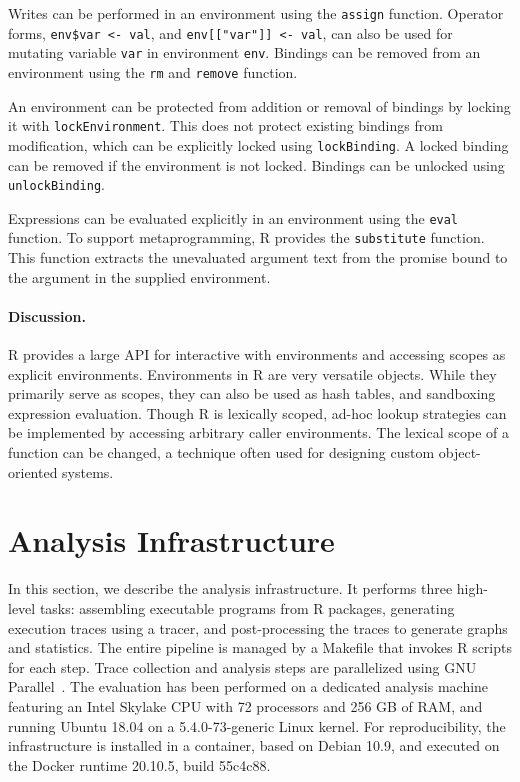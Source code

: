 \documentclass[10pt,review,sigplan,anonymous=true,authorversion=true,nonacm=true]{acmart}
\newcommand{\code}[1]{\lstinline |#1|\xspace}
\newcommand{\assign}{\code{assign}}
\newcommand{\remove}{\code{remove}}
\renewcommand{\rm}{\code{rm}}
\newcommand{\lockEnvironment}{\code{lockEnvironment}}
\newcommand{\lockBinding}{\code{lockBinding}}
\newcommand{\unlockBinding}{\code{unlockBinding}}
\newcommand{\eval}{\code{eval}}
\newcommand{\substitute}{\code{substitute}}
\begin{document}
Writes can be performed in an environment using the \assign function. Operator
forms, \code{env$var <- val}, and \code{env[["var"]] <- val}, can also be used
for mutating variable \code{var} in environment \code{env}. Bindings
can be removed from an environment using the \rm and \remove function.

An environment can be protected from addition or removal of bindings by locking
it with \lockEnvironment. This does not protect existing bindings from
modification, which can be explicitly locked using \lockBinding. A locked
binding can be removed if the environment is not locked. Bindings can be
unlocked using \unlockBinding.

Expressions can be evaluated explicitly in an environment using the \eval
function. To support metaprogramming, R provides the \substitute function. This
function extracts the unevaluated argument text from the promise bound to the
argument in the supplied environment.


\paragraph{Discussion.} R provides a large API for interactive with environments
and accessing scopes as explicit environments. Environments in R are very
versatile objects. While they primarily serve as scopes, they can also be used
as hash tables, and sandboxing expression evaluation. Though R is lexically
scoped, ad-hoc lookup strategies can be implemented by accessing arbitrary
caller environments. The lexical scope of a function can be changed, a technique
often used for designing custom object-oriented systems.

\section{Analysis Infrastructure}
In this section, we describe the analysis infrastructure. It performs three
high-level tasks: assembling executable programs from R packages, generating
execution traces using a tracer, and post-processing the traces to generate
graphs and statistics. The entire pipeline is managed by a Makefile that invokes
R scripts for each step. Trace collection and analysis steps are parallelized
using GNU Parallel~\cite{gnuparallel}. The evaluation has been performed on a
dedicated analysis machine featuring an Intel Skylake CPU with 72 processors and
256 GB of RAM, and running Ubuntu 18.04 on a 5.4.0-73-generic Linux kernel. For
reproducibility, the infrastructure is installed in a container, based on Debian
10.9, and executed on the Docker runtime 20.10.5, build 55c4c88.
\end{document}

